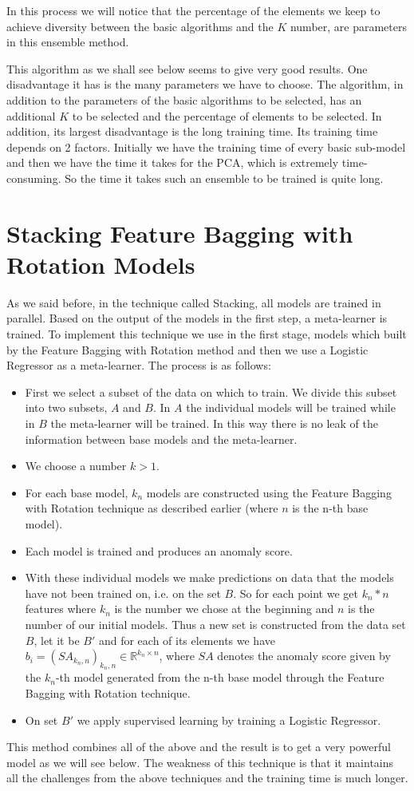 \documentclass[a4paper,12pt]{report}
\theoremstyle{definitionNODot}
\begin{document}
	In this process we will notice that the percentage of the elements we keep to achieve diversity between the basic algorithms and the $ K$ number, are parameters in this ensemble method.
	
	This algorithm as we shall see below seems to give very good results. One disadvantage it has is the many parameters we have to choose. The algorithm, in addition to the parameters of the basic algorithms to be selected, has an additional $ K $ to be selected and the percentage of elements to be selected. In addition, its largest disadvantage is the long training time. Its training time depends on 2 factors. Initially we have the training time of every basic sub-model and then we have the time it takes for the PCA, which is extremely time-consuming. So the time it takes such an ensemble to be trained is quite long.
	
	\section{Stacking Feature Bagging with Rotation Models}
	As we said before, in the technique called Stacking, all models are trained in parallel. Based on the output of the models in the first step, a meta-learner is trained. To implement this technique we use in the first stage, models which built by the Feature Bagging with Rotation method and then we use a Logistic Regressor as a meta-learner. The process is as follows:
	
	\begin{itemize}
		\item First we select a subset of the data on which to train. We divide this subset into two subsets, $A$ and $B$. In $A$ the individual models will be trained while in $B$ the meta-learner will be trained. In this way there is no leak of the information between base models and the meta-learner.
		\item We choose a number $k>1$.
		\item For each base model, $k_n$ models are constructed using the Feature Bagging with Rotation technique as described earlier (where $n$ is the n-th base model).
		\item Each model is trained and produces an anomaly score.
		\item With these individual models we make predictions on data that the models have not been trained on, i.e. on the set $B$. So for each point we get $k_n*n$ features where $k_n$ is the number we chose at the beginning and $n$ is the number of our initial models. Thus a new set is constructed from the data set $B$, let it be $B'$ and for each of its elements we have $b_i = (SA_{k_n,n})_{k_n,n} \in \mathbb{R} ^{k_n \times n}$, where $SA$ denotes the anomaly score given by the $k_n$-th model generated from the n-th base model through the Feature Bagging with Rotation technique.
		\item On set $B'$ we apply supervised learning by training a Logistic Regressor.
	\end{itemize}
	This method combines all of the above and the result is to get a very powerful model as we will see below. The weakness of this technique is that it maintains all the challenges from the above techniques and the training time is much longer.
	
\end{document}
